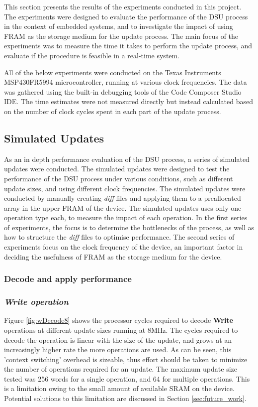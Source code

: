 This section presents the results of the experiments conducted in this project. The experiments were designed to evaluate the performance of the DSU process in the context of embedded systems, and to investigate the impact of using FRAM as the storage medium for the update process. The main focus of the experiments was to measure the time it takes to perform the update process, and evaluate if the procedure is feasible in a real-time system.

All of the below experiments were conducted on the Texas Instruments MSP430FR5994 microcontroller, running at various clock frequencies. The data was gathered using the built-in debugging tools of the Code Composer Studio IDE. The time estimates were not measured directly but instead calculated based on the number of clock cycles spent in each part of the update process. 

\subsection{Simulated Updates}
As an in depth performance evaluation of the DSU process, a series of simulated updates were conducted. The simulated updates were designed to test the performance of the DSU process under various conditions, such as different update sizes, and using different clock frequencies. The simulated updates were conducted by manually creating \textit{diff} files and applying them to a preallocated array in the upper FRAM of the device. The simulated updates uses only one operation type each, to measure the impact of each operation. In the first series of experiments, the focus is to determine the bottlenecks of the process, as well as how to structure the \textit{diff} files to optimise performance. The second series of experiments focus on the clock frequency of the device, an important factor in deciding the usefulness of FRAM as the storage medium for the device.
\subsubsection{Decode and apply performance}
\subsubsection*{\textbf{\textit{Write operation}}}
Figure \ref{fig:wDecode8} shows the processor cycles required to decode \textbf{Write} operations at different update sizes running at 8MHz. The cycles required to decode the operation is linear with the size of the update, and grows at an increasingly higher rate the more operations are used. As can be seen, this 'context switching' overhead is sizeable, thus effort should be taken to minimize the number of operations required for an update. The maximum update size tested was 256 words for a single operation, and 64 for multiple operations. This is a limitation owing to the small amount of available SRAM on the device. Potential solutions to this limitation are discussed in Section \ref{sec:future_work}. 

